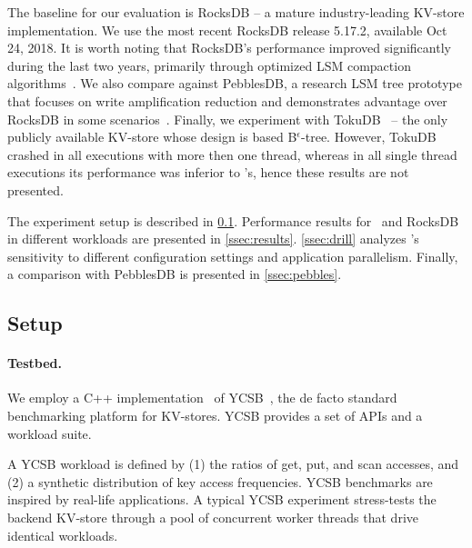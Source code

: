 The baseline for our evaluation is RocksDB -- a mature industry-leading KV-store implementation. 
We use the most recent RocksDB release 5.17.2, available Oct 24, 2018.  
It is worth noting that RocksDB's performance improved significantly during the last two years, primarily through 
optimized LSM compaction algorithms~\cite{CallaghanCompaction}.   We also compare against PebblesDB, 
a research LSM tree prototype that focuses on write amplification reduction and demonstrates advantage
over RocksDB in some scenarios~\cite{PebblesDB}. Finally, we experiment with TokuDB~\cite{TokuDB} -- 
the only publicly available KV-store whose design is based B$^\epsilon$-tree. However, TokuDB crashed 
in all executions with more then one thread, whereas in all single thread executions its performance was 
inferior to \sys's, hence these results are not presented.

The experiment setup is described in \cref{ssec:setup}. 
Performance results for \sys\ and RocksDB in 
different workloads are presented in \cref{ssec:results}. 
\cref{ssec:drill} analyzes \sys's sensitivity to different configuration settings and application parallelism. 
Finally, a comparison with PebblesDB is presented in \cref{ssec:pebbles}.
 

\subsection{Setup}
\label{ssec:setup} 

\paragraph{Testbed.} We employ a C++ implementation~\cite{Cpp-YCSB} of YCSB~\cite{YCSB}, the  de facto standard  
benchmarking platform for KV-stores. 
YCSB provides a set of APIs and a workload suite. 

A YCSB workload is defined by  (1) the ratios of get, put, and scan accesses, 
and (2) a synthetic distribution of key access frequencies. 
YCSB  benchmarks  are inspired by real-life applications.
A typical YCSB experiment stress-tests the backend KV-store through a pool of concurrent worker threads that drive identical
workloads. %

